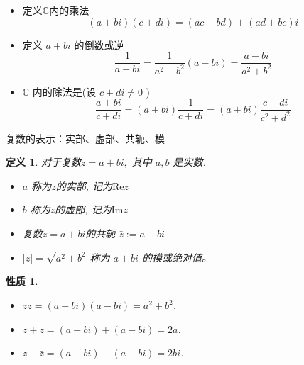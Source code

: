 \documentclass[13pt,fontset=mac]{ctexbeamer}
\newtheorem*{defi}{定义}
\newtheorem*{prop}{性质}
\begin{document}
\begin{frame}
	\begin{itemize}
		\item 定义$\mathbb{C}$内的乘法
		\[
		(a+b i)(c+d i) =(a c-b d)+(a d+b c) i
		\]
		
		\item 定义 $a+b {i}$ 的倒数或逆
		\[
		\frac{1}{a+b i}=\frac{1}{a^{2}+b^{2}}(a-b i)=\frac{a-b i}{a^{2}+b^{2}}
		\]
		\item  $\mathbb{C}$ 内的除法是(设 $c+d {i} \neq 0$ )
		\[
		\frac{a+b i}{c+d i}=(a+b i) \frac{1}{c+d i}=(a+b i) \frac{c-d i}{c^{2}+d^{2}}
		\]
	\end{itemize}
\end{frame}

\begin{frame}{复数的表示：实部、虚部、共轭、模}
	
	\begin{defi}
		对于复数$z=a+b i,$ 其中 $a, b$ 是实数.
		
		\begin{itemize}
			\item $a$ 称为$z$的\alert{实部}, 记为$\text{Re} z$
			
			\item $b$ 称为$z$的\alert{虚部}, 记为$\text{Im}  z$
			
			\item 复数$z=a+b i$的\alert{共轭} $\bar{z}:=a-bi$ 
			\item  $|z|=\sqrt{a^{2}+b^{2}}$ 称为 $a+b i$ 的\alert{模}或绝对值。
		\end{itemize}
	\end{defi}
	\begin{prop}
		\begin{itemize}
			\item $z  \bar{z}=(a+b i)(a-b i)=a^{2}+b^{2}$.
			\item $z+\bar{z}=(a+b i)+(a-b i)=2 a$.
			\item $z-\bar{z}=(a+b i)-(a-b i)=2 b i$.
		\end{itemize}
	\end{prop}
\end{frame}
\end{document}
